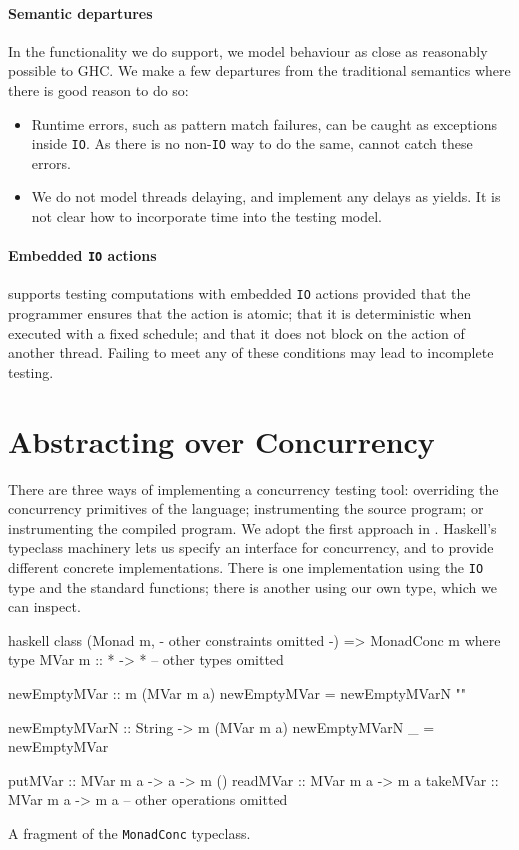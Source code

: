 \paragraph{Semantic departures}
In the functionality we do support, we model behaviour as close as
reasonably possible to GHC.  We make a few departures from the
traditional semantics where there is good reason to do so:

\begin{itemize}
\item Runtime errors, such as pattern match failures, can be caught as
  exceptions inside \verb|IO|.  As there is no non-\verb|IO| way to do
  the same, \dejafu{} cannot catch these errors.

\item We do not model threads delaying, and implement any delays as
  yields.  It is not clear how to incorporate time into the testing
  model.
\end{itemize}

\paragraph{Embedded \texttt{IO} actions}
\dejafu{} supports testing computations with embedded \verb|IO|
actions provided that the programmer ensures that the action is
atomic; that it is deterministic when executed with a fixed schedule;
and that it does not block on the action of another thread.  Failing
to meet any of these conditions may lead to incomplete testing.

\section{Abstracting over Concurrency}
\label{sec:dejafu-monadconc}

There are three ways of implementing a concurrency testing tool:
overriding the concurrency primitives of the language; instrumenting
the source program; or instrumenting the compiled program.  We adopt
the first approach in \dejafu{}.  Haskell's typeclass machinery lets
us specify an interface for concurrency, and to provide different
concrete implementations.  There is one implementation using the
\verb|IO| type and the standard functions; there is another using our
own type, which we can inspect.

\begin{listing}
\centering
\begin{cminted}{haskell}
class (Monad m, {- other constraints omitted -}) => MonadConc m where
  type MVar m :: * -> *
  -- other types omitted

  newEmptyMVar :: m (MVar m a)
  newEmptyMVar = newEmptyMVarN ""

  newEmptyMVarN :: String -> m (MVar m a)
  newEmptyMVarN _ = newEmptyMVar

  putMVar  :: MVar m a -> a -> m ()
  readMVar :: MVar m a -> m a
  takeMVar :: MVar m a -> m a
  -- other operations omitted
\end{cminted}
\caption{A fragment of the \texttt{MonadConc} typeclass.}\label{lst:monadconc}
\end{listing}

